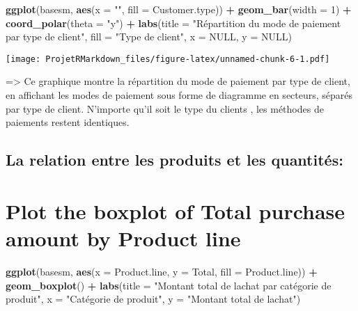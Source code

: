 \documentclass[
]{article}
\newenvironment{Shaded}{\begin{snugshade}}{\end{snugshade}}
\newcommand{\AttributeTok}[1]{\textcolor[rgb]{0.13,0.29,0.53}{#1}}
\newcommand{\ConstantTok}[1]{\textcolor[rgb]{0.56,0.35,0.01}{#1}}
\newcommand{\DecValTok}[1]{\textcolor[rgb]{0.00,0.00,0.81}{#1}}
\newcommand{\FunctionTok}[1]{\textcolor[rgb]{0.13,0.29,0.53}{\textbf{#1}}}
\newcommand{\NormalTok}[1]{#1}
\newcommand{\SpecialCharTok}[1]{\textcolor[rgb]{0.81,0.36,0.00}{\textbf{#1}}}
\newcommand{\StringTok}[1]{\textcolor[rgb]{0.31,0.60,0.02}{#1}}
\begin{document}
\begin{Shaded}
\begin{Highlighting}[]
\FunctionTok{ggplot}\NormalTok{(basesm, }\FunctionTok{aes}\NormalTok{(}\AttributeTok{x =} \StringTok{""}\NormalTok{, }\AttributeTok{fill =} \StringTok{\textasciigrave{}}\AttributeTok{Customer.type}\StringTok{\textasciigrave{}}\NormalTok{)) }\SpecialCharTok{+}
  \FunctionTok{geom\_bar}\NormalTok{(}\AttributeTok{width =} \DecValTok{1}\NormalTok{) }\SpecialCharTok{+}
  \FunctionTok{coord\_polar}\NormalTok{(}\AttributeTok{theta =} \StringTok{"y"}\NormalTok{) }\SpecialCharTok{+}
  \FunctionTok{labs}\NormalTok{(}\AttributeTok{title =} \StringTok{"Répartition du mode de paiement par type de client"}\NormalTok{,}
       \AttributeTok{fill =} \StringTok{"Type de client"}\NormalTok{,}
       \AttributeTok{x =} \ConstantTok{NULL}\NormalTok{,}
       \AttributeTok{y =} \ConstantTok{NULL}\NormalTok{)}
\end{Highlighting}
\end{Shaded}

\texttt{[image: ProjetRMarkdown\_files/figure-latex/unnamed-chunk-6-1.pdf]}

=\textgreater{} Ce graphique montre la répartition du mode de paiement
par type de client, en affichant les modes de paiement sous forme de
diagramme en secteurs, séparés par type de client. N'importe qu'il soit
le type du clients , les méthodes de paiements restent identiques.

\hypertarget{la-relation-entre-les-produits-et-les-quantituxe9s}{%
\subsection{La relation entre les produits et les
quantités:}\label{la-relation-entre-les-produits-et-les-quantituxe9s}}

\hypertarget{plot-the-boxplot-of-total-purchase-amount-by-product-line}{%
\section{Plot the boxplot of Total purchase amount by Product
line}\label{plot-the-boxplot-of-total-purchase-amount-by-product-line}}

\begin{Shaded}
\begin{Highlighting}[]
\FunctionTok{ggplot}\NormalTok{(basesm, }\FunctionTok{aes}\NormalTok{(}\AttributeTok{x =}\NormalTok{ Product.line, }\AttributeTok{y =}\NormalTok{ Total, }\AttributeTok{fill =}\NormalTok{ Product.line)) }\SpecialCharTok{+}
  \FunctionTok{geom\_boxplot}\NormalTok{() }\SpecialCharTok{+}
  \FunctionTok{labs}\NormalTok{(}\AttributeTok{title =} \StringTok{"Montant total de l\textquotesingle{}achat par catégorie de produit"}\NormalTok{,}
       \AttributeTok{x =} \StringTok{"Catégorie de produit"}\NormalTok{,}
       \AttributeTok{y =} \StringTok{"Montant total de l\textquotesingle{}achat"}\NormalTok{)}
\end{Highlighting}
\end{Shaded}
\end{document}
